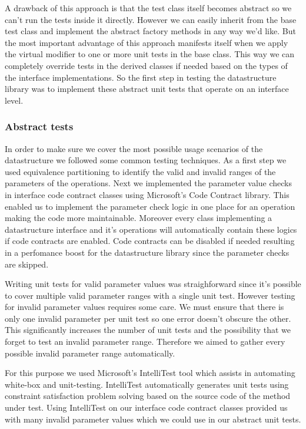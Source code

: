 A drawback of this approach is that the test class itself becomes abstract so we can't run the tests inside it directly. However we can easily inherit from the base test class and implement the abstract factory methods in any way we'd like. But the most important advantage of this approach manifests itself when we apply the virtual modifier to one or more unit tests in the base class. This way we can completely override tests in the derived classes if needed based on the types of the interface implementations. So the first step in testing the datastructure library was to implement these abstract unit tests that operate on an interface level.

\subsubsection{Abstract tests}

In order to make sure we cover the most possible usage scenarios of the datastructure we followed some common testing techniques. As a first step we used equivalence partitioning to identify the valid and invalid ranges of the parameters of the operations. Next we implemented the parameter value checks in interface code contract classes using Microsoft's Code Contract library. This enabled us to implement the parameter check logic in one place for an operation making the code more maintainable. Moreover every class implementing a datastructure interface and it's operations will automatically contain these logics if code contracts are enabled. Code contracts can be disabled if needed resulting in a perfomance boost for the datastructure library since the parameter checks are skipped.

Writing unit tests for valid parameter values was straighforward since it's possible to cover multiple valid parameter ranges with a single unit test. However testing for invalid parameter values requires some care. We must ensure that there is only one invalid parameter per unit test so one error doesn't obscure the other. This significantly increases the number of unit tests and the possibility that we forget to test an invalid parameter range. Therefore we aimed to gather every possible invalid parameter range automatically. 

For this purpose we used Microsoft's IntelliTest tool which assists in automating white-box and unit-testing. IntelliTest automatically generates unit tests using constraint satisfaction problem solving based on the source code of the method under test. Using IntelliTest on our interface code contract classes provided us with many invalid parameter values which we could use in our abstract unit tests.

